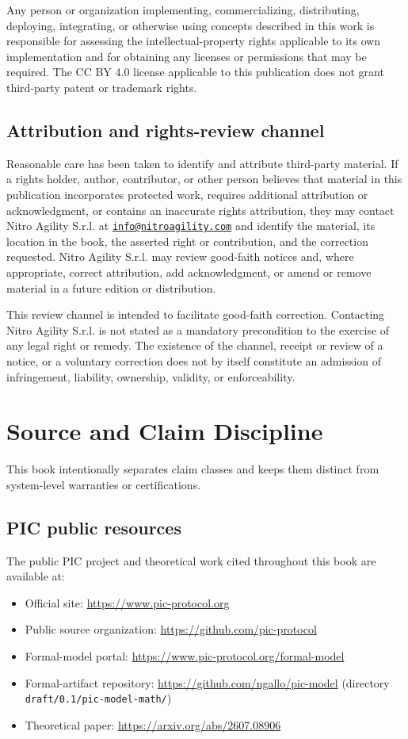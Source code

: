 \documentclass[10pt,oneside,openany]{book}
\newcommand{\mono}[1]{\texttt{#1}}
\begin{document}
Any person or organization implementing, commercializing, distributing, deploying, integrating, or otherwise using concepts described in this work is responsible for assessing the intellectual-property rights applicable to its own implementation and for obtaining any licenses or permissions that may be required. The CC BY 4.0 license applicable to this publication does not grant third-party patent or trademark rights.

\section{Attribution and rights-review channel}
Reasonable care has been taken to identify and attribute third-party material. If a rights holder, author, contributor, or other person believes that material in this publication incorporates protected work, requires additional attribution or acknowledgment, or contains an inaccurate rights attribution, they may contact Nitro Agility S.r.l. at \href{mailto:info@nitroagility.com}{\nolinkurl{info@nitroagility.com}} and identify the material, its location in the book, the asserted right or contribution, and the correction requested. Nitro Agility S.r.l. may review good-faith notices and, where appropriate, correct attribution, add acknowledgment, or amend or remove material in a future edition or distribution.

This review channel is intended to facilitate good-faith correction. Contacting Nitro Agility S.r.l. is not stated as a mandatory precondition to the exercise of any legal right or remedy. The existence of the channel, receipt or review of a notice, or a voluntary correction does not by itself constitute an admission of infringement, liability, ownership, validity, or enforceability.

\chapter{Source and Claim Discipline}\label{app:claims}
This book intentionally separates claim classes and keeps them distinct from system-level warranties or certifications.

\section{PIC public resources}
The public PIC project and theoretical work cited throughout this book are available at:
\begin{itemize}
\item Official site: \url{https://www.pic-protocol.org}
\item Public source organization: \url{https://github.com/pic-protocol}
\item Formal-model portal: \url{https://www.pic-protocol.org/formal-model}
\item Formal-artifact repository: \url{https://github.com/ngallo/pic-model} (directory \mono{draft/0.1/pic-model-math/})
\item Theoretical paper: \url{https://arxiv.org/abs/2607.08906}
\end{itemize}
\end{document}
